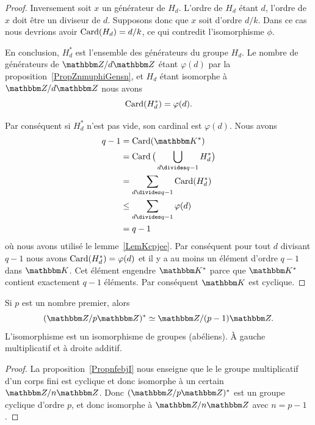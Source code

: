 \begin{proof}
    Inversement soit \( x\) un générateur de \( H_d\). L'ordre de \( H_d\) étant \( d\), l'ordre de \( x\) doit être un diviseur de \( d\). Supposons donc que \( x\) soit d'ordre \( d/k\). Dans ce cas nous devrions avoir \( \operatorname{Card}(H_d)=d/k\), ce qui contredit l'isomorphisme \( \phi\).

    En conclusion, \( H^*_d\) est l'ensemble des générateurs du groupe \( H_d\). Le nombre de générateurs de \( \eZ/d\eZ\) étant \( \varphi(d)\) par la proposition~\ref{PropZnmuphiGensn}, et \( H_d\) étant isomorphe à \( \eZ/d\eZ\) nous avons
    \begin{equation}
        \operatorname{Card}(H^*_d)=\varphi(d).
    \end{equation}

    Par conséquent si \( H^*_d\) n'est pas vide, son cardinal est \( \varphi(d)\). Nous avons
    \begin{subequations}
        \begin{align}
            q-1&=\Card(\eK^*)\\
            &=\Card\big( \bigcup_{d\divides q-1}H^*_d \big)\\
            &=\sum_{d\divides q-1}\Card(H^*_d)\\
            &\leq \sum_{d\divides q-1}\varphi(d)\\
            &=q-1
        \end{align}
    \end{subequations}
    où nous avons utilisé le lemme~\ref{LemKcpjee}. Par conséquent pour tout \( d\) divisant \( q-1\) nous avons \( \operatorname{Card}(H^*_d)=\varphi(d)\) et il y a au moins un élément d'ordre \( q-1\) dans \( \eK\). Cet élément engendre \( \eK^*\) parce que \( \eK^*\) contient exactement \( q-1\) éléments. Par conséquent \( \eK\) est cyclique.
\end{proof}

\begin{corollary}   \label{CorpRUndR}
    Si \( p\) est un nombre premier, alors
    \begin{equation}
        (\eZ/p\eZ)^*\simeq\eZ/(p-1)\eZ.
    \end{equation}
    L'isomorphisme est un isomorphisme de groupes (abéliens). À gauche multiplicatif et à droite additif.
\end{corollary}

\begin{proof}
    La proposition~\ref{PropnfebjI} nous enseigne que le le groupe multiplicatif d'un corps fini est cyclique et donc isomorphe à un certain \( \eZ/n\eZ\). Donc \( (\eZ/p\eZ)^*\) est un groupe cyclique d'ordre \( p\), et donc isomorphe à \( \eZ/n\eZ\) avec \( n=p-1\).
\end{proof}

